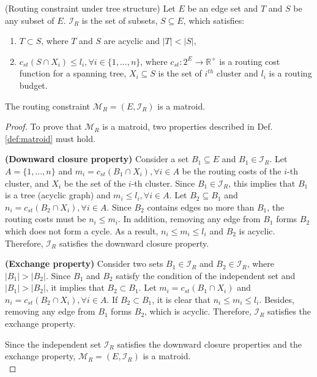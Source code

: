 \begin{theorem} \label{thm:routing-matroid} (Routing constraint under tree structure)
Let $E$ be an edge set and $T$ and $S$ be any subset of $E$. $\mathcal{I}_R$ is the set of subsets, $S\subseteq E$, which satisfies:
\begin{enumerate}
    \item $T \subset S$, where $T$ and $S$ are acyclic and $|T| < |S|$,
    \item $c_{st}(S \cap X_i) \leq l_i , \forall i\in \{1,...,n\}$, where $c_{st}:2^E \rightarrow \mathbb{R}^+$ is a routing cost function for a spanning tree, $X_i \subseteq S$ is the set of $i^{th}$ cluster and $l_i$ is a routing budget.
\end{enumerate}

The routing constraint $\mathcal{M}_R=(E, \mathcal{I}_R)$ is a matroid.
\end{theorem}
\begin{proof}
To prove that $\mathcal{M}_R$ is a matroid, two properties described in Def. \ref{def:matroid} must hold.

\textbf{(Downward closure property)} Consider a set $B_1\subseteq E$ and $B_1 \in \mathcal{I}_R$.
Let $A=\{1,...,n\}$ and $m_i=c_{st}(B_1 \cap X_i), \forall i\in A$ be the routing costs of the $i$-th cluster, and $X_i$ be the set of the $i$-th cluster.
Since $B_1 \in \mathcal{I}_R$, this implies that $B_1$ is a tree (acyclic graph) and $m_i \leq l_i, \forall i\in A$.
Let $B_2 \subseteq B_1$ and $n_i=c_{st}(B_2 \cap X_i), \forall i\in A$.
Since $B_2$ contains edges no more than $B_1$, the routing costs must be $n_i \leq m_i$.
In addition, removing any edge from $B_1$ forms $B_2$ which does not form a cycle.
As a result, $n_i \leq m_i \leq l_i$ and $B_2$ is acyclic.
Therefore, $\mathcal{I}_R$ satisfies the downward closure property.

\textbf{(Exchange property)} Consider two sets $B_1 \in \mathcal{I}_R$ and $B_2\in \mathcal{I}_R$, where $|B_1|>|B_2|$.
Since $B_1$ and $B_2$ satisfy the condition of the independent set and $|B_1|>|B_2|$, it implies that $B_2 \subset B_1$.
Let $m_i=c_{st}(B_1 \cap X_i)$ and $n_i=c_{st}(B_2 \cap X_i), \forall i\in A$.
If $B_2 \subset B_1$, it is clear that $n_i \leq m_i \leq l_i$.
Besides, removing any edge from $B_1$ forms $B_2$, which is acyclic.
Therefore, $\mathcal{I}_R$ satisfies the exchange property.

Since the independent set $\mathcal{I}_R$ satisfies the downward closure properties and the exchange property, $\mathcal{M}_R=(E, \mathcal{I}_R)$ is a matroid.\\
\end{proof}

